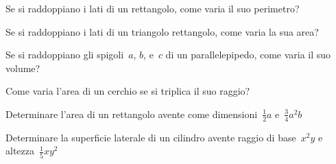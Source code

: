 \begin{multicols}{2}
\begin{esercizio}
\label{ese:10.36}
 Se si raddoppiano i lati di un rettangolo, come varia il suo
perimetro?
\end{esercizio}

\begin{esercizio}
\label{ese:10.37}
 Se si raddoppiano i lati di un triangolo rettangolo, come varia la sua
area?
\end{esercizio}

\begin{esercizio}
\label{ese:10.38}
 Se si raddoppiano gli spigoli~\(a\), \(b\), e~\(c\) di un parallelepipedo, come
varia il suo volume?
\end{esercizio}

\begin{esercizio}
\label{ese:10.39}
 Come varia l'area di un cerchio se si triplica il suo
raggio?
\end{esercizio}

\begin{esercizio}
\label{ese:10.40}
 Determinare l'area di un rettangolo avente come
dimensioni~\(\frac{1}{2}a\) e~\(\frac{3}{4}a^{2}b\)
\end{esercizio}

\begin{esercizio}
\label{ese:10.41}
 Determinare la superficie laterale di un cilindro avente raggio di
base~\(x^{2}y\) e altezza~\(\frac{1}{5}{xy}^{2}\)
\end{esercizio}
\end{multicols}

